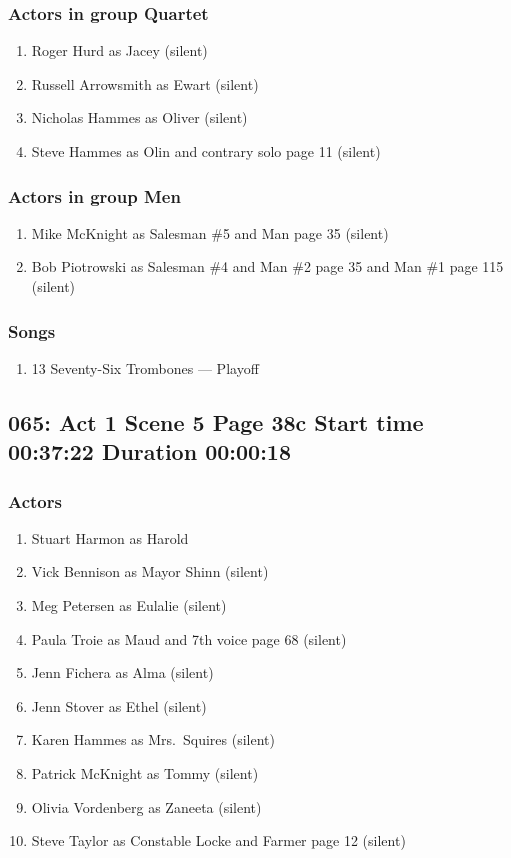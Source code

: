 \subsubsection{Actors in group Quartet}
\begin{enumerate}
\item Roger Hurd as Jacey (silent)
\item Russell Arrowsmith as Ewart (silent)
\item Nicholas Hammes as Oliver (silent)
\item Steve Hammes as Olin and contrary solo page 11 (silent)
\end{enumerate}
\subsubsection{Actors in group Men}
\begin{enumerate}
\item Mike McKnight as Salesman \#5 and Man page 35 (silent)
\item Bob Piotrowski as Salesman \#4 and Man \#2 page 35 and Man \#1 page 115 (silent)
\end{enumerate}

\subsubsection{Songs}
\begin{enumerate}
\item 13 Seventy-Six Trombones --- Playoff
\end{enumerate}
\subsection{065: Act 1 Scene 5 Page 38c Start time 00:37:22 Duration 00:00:18}

\subsubsection{Actors}
\begin{enumerate}
\item Stuart Harmon as Harold
\item Vick Bennison as Mayor Shinn (silent)
\item Meg Petersen as Eulalie (silent)
\item Paula Troie as Maud and 7th voice page 68 (silent)
\item Jenn Fichera as Alma (silent)
\item Jenn Stover as Ethel (silent)
\item Karen Hammes as Mrs.~Squires (silent)
\item Patrick McKnight as Tommy (silent)
\item Olivia Vordenberg as Zaneeta (silent)
\item Steve Taylor as Constable Locke and Farmer page 12 (silent)
\end{enumerate}
